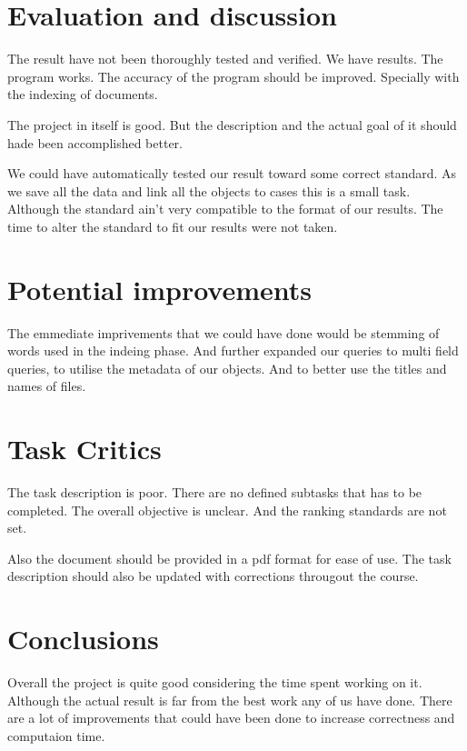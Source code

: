 \documentclass[12pt, a4paper]{article}
\begin{document}
\section{Evaluation and discussion}
The result have not been thoroughly tested and verified. We have results. The
program works. The accuracy of the program should be improved. Specially with
the indexing of documents.

The project in itself is good. But the description and the actual goal of it
should hade been accomplished better. 

We could have automatically tested our result toward some correct standard. As
we save all the data and link all the objects to cases this is a small task.
Although the standard ain't very compatible to the format of our results. 
The time to alter the standard to fit our results were not taken. 

\section{Potential improvements}

The emmediate imprivements that we could have done would be stemming of words
used in the indeing phase. And further expanded our queries to multi field
queries, to utilise the metadata of our objects. And to better use the titles
and names of files. 

\section{Task Critics}
The task description is poor. There are no defined subtasks that has to be
completed. The overall objective is unclear. And the ranking standards are not
set. 

Also the document should be provided in a pdf format for ease of use.
The task description should also be updated with corrections througout the
course. 

\section{Conclusions}
Overall the project is quite good considering the time spent working on it. 
Although the actual result is far from the best work any of us have done. 
There are a lot of improvements that could have been done to increase
correctness and computaion time. 
\end{document}
